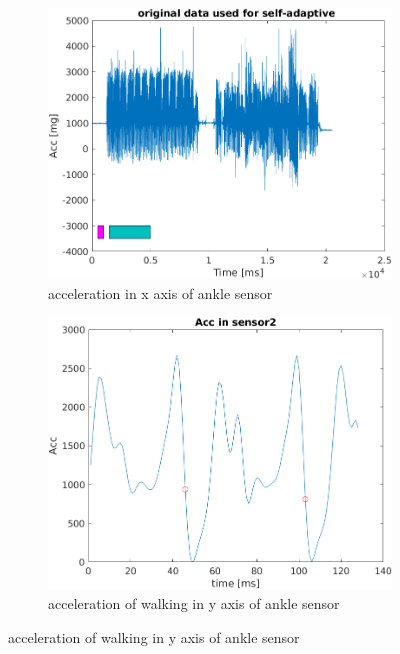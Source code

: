 \documentclass[article]{article}
\begin{document}
\begin{figure}
	
	
	\begin{subfigure}[b]{0.47\textwidth}
		\centering
		\includegraphics[width=\textwidth]{training_data_s2_p2}
		\caption{acceleration in x axis of ankle sensor}
		\label{fig:y equals x}
	\end{subfigure}
	\hfill
	\begin{subfigure}[b]{0.47\textwidth}
		\centering
		\includegraphics[width=\textwidth]{acc_step_s1_p2}
		\caption{acceleration of walking in y axis of ankle sensor}
		\label{fig:three sin x}
	\end{subfigure}
	\hfill
	

\end{figure}
\end{document}
